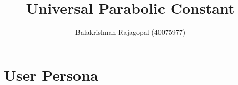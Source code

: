 \documentclass{report}
\title{Universal Parabolic Constant}
\author{Balakrishnan Rajagopal (40075977) }
\date{}
\begin{document}
\maketitle

\newpage
\chapter{User Persona}







\end{document}
